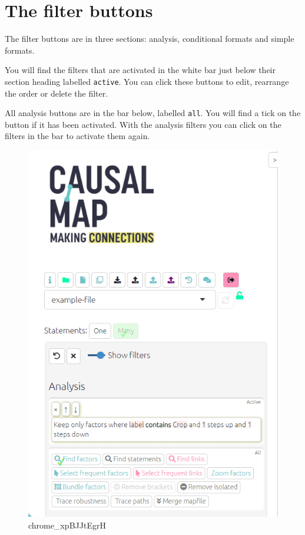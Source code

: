 \documentclass[
]{book}
\begin{document}
\hypertarget{the-filter-buttons-1}{%
\section{The filter buttons}\label{the-filter-buttons-1}}

The filter buttons are in three sections: analysis, conditional formats and simple formats.

You will find the filters that are activated in the white bar just below their section heading labelled \texttt{active}. You can click these buttons to edit, rearrange the order or delete the filter.

All analysis buttons are in the bar below, labelled \texttt{all}. You will find a tick on the button if it has been activated. With the analysis filters you can click on the filters in the bar to activate them again.

\begin{figure}
\centering
\includegraphics{_assets/chrome_xpBJJtEgrH.gif}
\caption{chrome\_xpBJJtEgrH}
\end{figure}
\end{document}
